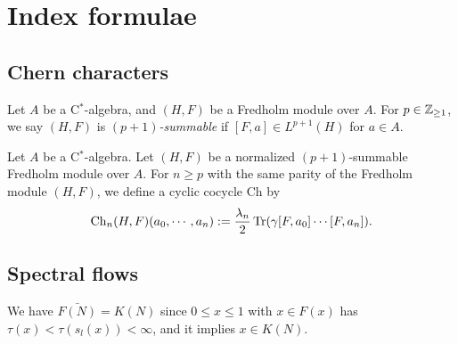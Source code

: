 \documentclass{../../large}
\begin{document}
\begin{prb}
\end{prb}








\chapter{Index formulae}

\section{Chern characters}

\begin{prb}[Summability]
Let $A$ be a C$^*$-algebra, and $(H,F)$ be a Fredholm module over $A$.
For $p\in\mathbb{Z}_{\ge1}$, we say $(H,F)$ is \emph{$(p+1)$-summable} if $[F,a]\in L^{p+1}(H)$ for $a\in A$.

\end{prb}

Let $A$ be a C$^*$-algebra.
Let $(H,F)$ be a normalized $(p+1)$-summable Fredholm module over $A$.
For $n\ge p$ with the same parity of the Fredholm module $(H,F)$, we define a cyclic cocycle $\mathrm{Ch}$ by
\[\mathrm{Ch}_n(H,F)(a_0,\cdots,a_n):=\frac{\lambda_n}2\operatorname{Tr}(\gamma[F,a_0]\cdots[F,a_n]).\]


\section{Spectral flows}

We have $\bar{F(N)}=K(N)$ since $0\le x\le1$ with $x\in F(x)$ has $\tau(x)<\tau(s_l(x))<\infty$, and it implies $x\in K(N)$.
\end{document}
